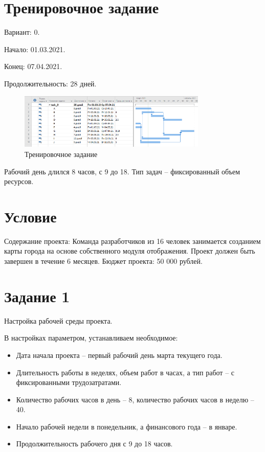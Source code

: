 \section{Тренировочное задание}

Вариант: 0.

Начало: 01.03.2021.

Конец: 07.04.2021.

Продолжительность: 28 дней.

\begin{figure}[H]
	\centering
	\includegraphics[width=0.8\textwidth]{img/content/task_0.png}
	\caption{Тренировочное задание}
\end{figure}

Рабочий день длился 8 часов, с 9 до 18. Тип задач -- фиксированный объем ресурсов.

\section{Условие}

Содержание проекта: Команда разработчиков из 16 человек занимается созданием карты города на основе собственного модуля отображения. Проект должен быть завершен в течение 6 месяцев. Бюджет проекта: 50 000 рублей.


\section{Задание 1}

Настройка рабочей среды проекта.

В настройках параметром, устанавливаем необходимое:

\begin{itemize}
	\item Дата начала проекта -- первый рабочий день марта текущего года.
	\item Длительность работы в неделях, объем работ в часах, а тип работ -- с фиксированными трудозатратами.
	\item Количество рабочих часов в день -- 8, количество рабочих часов в неделю -- 40.
	\item Начало рабочей недели в понедельник, а финансового года -- в январе.
	\item Продолжительность рабочего дня с 9 до 18 часов.
\end{itemize}


